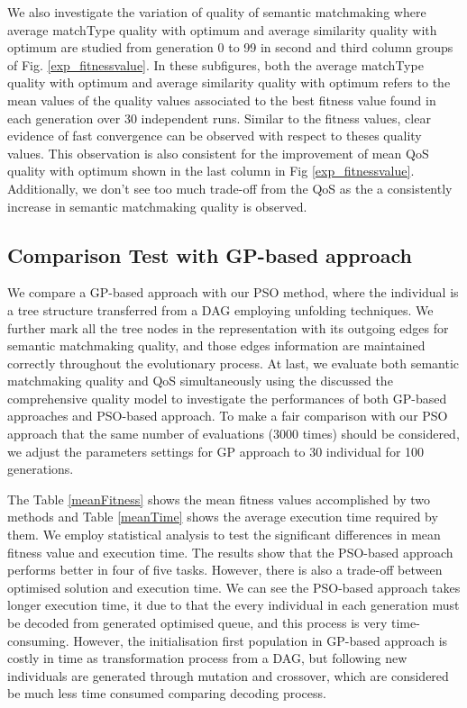 \documentclass{IEEEtran}
\begin{document}
We also investigate the variation of quality of semantic matchmaking where average matchType quality with optimum and average similarity quality with optimum are studied from generation 0 to 99 in second and third column groups of Fig. \ref{exp_fitnessvalue}. In these subfigures, both the average matchType quality with optimum and average similarity quality with optimum refers to the mean values of the quality values associated to the best fitness value found in each generation over 30 independent runs. Similar to the fitness values, clear evidence of fast convergence can be observed with respect to theses quality values. This observation is also consistent for the improvement of mean QoS quality with optimum shown in the last column in Fig \ref{exp_fitnessvalue}. Additionally, we don't see too much trade-off from the QoS as the a consistently increase in semantic matchmaking quality is observed.


\subsection{Comparison Test with GP-based approach}\label{comparisonTestWithGP}
We compare a GP-based approach  \cite{ma2015hybrid} with our PSO method, where the individual is a tree structure transferred from a DAG employing unfolding techniques. We further mark all the tree nodes in the representation with its outgoing edges for semantic matchmaking quality, and those edges information are maintained correctly throughout the evolutionary process. At last, we evaluate both semantic matchmaking quality and QoS simultaneously using the discussed the comprehensive quality model to investigate the performances of both GP-based approaches and PSO-based approach. To make a fair comparison with our PSO approach that the same number of evaluations (3000 times) should be considered, we adjust the parameters settings for GP approach \cite{ma2015hybrid} to 30 individual for 100 generations.

The Table \ref{meanFitness} shows the mean fitness values accomplished by two methods and Table \ref{meanTime} shows the average execution time required by them. We employ statistical analysis to test the significant differences in mean fitness value and execution time.  The results show that the PSO-based approach performs better in four of five tasks. However, there is also a trade-off between optimised solution and execution time. We can see the PSO-based approach takes longer execution time, it due to that the every individual in each generation must be decoded from generated optimised queue, and this process is very time-consuming. However,  the initialisation first population in GP-based approach is costly in time as transformation process from a DAG, but following new individuals are generated through mutation and crossover, which are considered be much less time consumed comparing decoding process.
\end{document}
